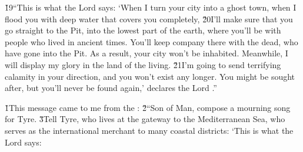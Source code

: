 \v{19}``This is what the Lord  says: `When I turn your city into a ghost town, when I flood you with deep water that covers you completely, \v{20}I'll make sure that you go straight to the Pit, into the lowest part of the earth, where you'll be with people who lived in ancient times. You'll keep company there with the dead, who have gone into the Pit. As a result, your city won't be inhabited. Meanwhile, I will display my glory in the land of the living. \v{21}I'm going to send terrifying calamity in your direction, and you won't exist any longer. You might be sought after, but you'll never be found again,' declares the Lord .''

\v{1}This message came to me from the : \v{2}``Son of Man, compose a mourning song for Tyre. \v{3}Tell Tyre, who lives at the gateway to the Mediterranean Sea, who serves as the international merchant to many coastal districts: `This is what the Lord  says:

